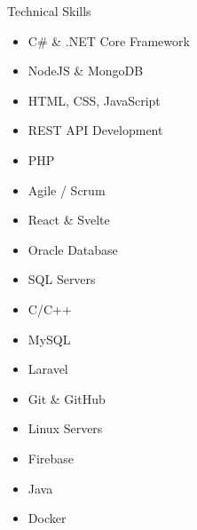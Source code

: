 \documentclass{resume} %
\begin{document}
\begin{rSection}{Technical Skills}
        \begin{multicols}{3}
        \begin{itemize}[noitemsep,topsep=-6pt]
            \item C\# \& .NET Core Framework
            \item NodeJS \& MongoDB
            \item HTML, CSS, JavaScript
            \item REST API Development
            \item PHP
            \item Agile / Scrum 
        \end{itemize}
        \columnbreak
        \begin{itemize}[noitemsep,topsep=-6pt]
            \item React \& Svelte
            \item Oracle Database
            \item SQL Servers 
            \item C/C++
            \item MySQL
            \item Laravel
        \end{itemize}

        \columnbreak
        
        \begin{itemize}[noitemsep,topsep=-6pt]
            \item Git \& GitHub
            \item Linux Servers
            \item Firebase
            \item Java
            \item Docker
        \end{itemize}
        \end{multicols}

\end{rSection}
\end{document}
